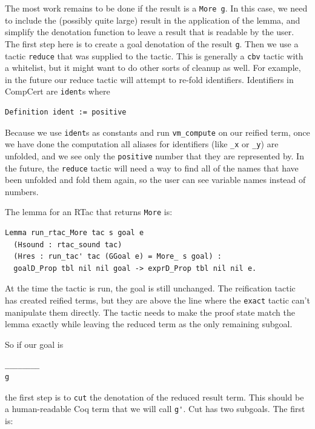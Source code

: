 \documentclass{puthesis}
\begin{document}
 The most work remains to be done if the result is a
\lstinline|More g|. In this case, we need to include the (possibly quite
large) result in the application of the lemma, and simplify the
denotation function to leave a result that is readable by the user. 
The first step here is to create a goal denotation of the result
\lstinline|g|. Then we use a tactic \lstinline|reduce| that was
supplied to the tactic. This is generally a \lstinline|cbv| tactic
with a whitelist, but it might want to do other sorts of cleanup as
well. For example, in the future our reduce tactic will attempt to
re-fold identifiers. Identifiers in CompCert are \lstinline|ident|s
where 

\begin{lstlisting}
Definition ident := positive
\end{lstlisting}

Because we use \lstinline|ident|s as constants and run
\lstinline|vm_compute| on our reified term, once we have done the
computation all aliases for identifiers (like \lstinline|_x| or
\lstinline|_y|) are unfolded, and we see only the \lstinline|positive|
number that they are represented by. In the future, the
\lstinline|reduce| tactic will need a way to find all of the names
that have been unfolded and fold them again, so the user can see
variable names instead of numbers. 

The lemma for an RTac that returns \lstinline|More| is:

\begin{lstlisting}
Lemma run_rtac_More tac s goal e
  (Hsound : rtac_sound tac) 
  (Hres : run_tac' tac (GGoal e) = More_ s goal) :
  goalD_Prop tbl nil nil goal -> exprD_Prop tbl nil nil e.
\end{lstlisting}

At the time the tactic is run, the goal is still unchanged. The
reification tactic has created reified terms, but they are above the
line where the \lstinline|exact| tactic can't manipulate them
directly. The tactic needs to make the proof state match the lemma
exactly while leaving the reduced term as the only remaining
subgoal.

So if our goal is 

\begin{lstlisting}
________
g
\end{lstlisting}

the first step is to \lstinline|cut| the denotation of the reduced
result term. This should be a human-readable Coq term that we will
call \lstinline|g'|. Cut has two subgoals. The first is:
\end{document}
